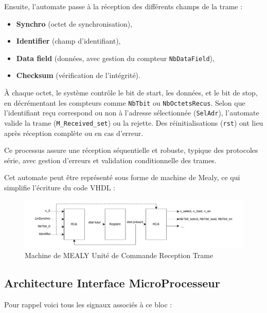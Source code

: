 Ensuite, l'automate passe à la réception des différents champs de la trame :
\begin{itemize}
    \item \textbf{Synchro} (octet de synchronisation),
    \item \textbf{Identifier} (champ d'identifiant),
    \item \textbf{Data field} (données, avec gestion du compteur \texttt{NbDataField}),
    \item \textbf{Checksum} (vérification de l'intégrité).
\end{itemize}

À chaque octet, le système contrôle le bit de start, les données, et le bit de stop, en décrémentant 
les compteurs comme \texttt{NbTbit} ou \texttt{NbOctetsRecus}. Selon que l'identifiant reçu 
correspond ou non à l'adresse sélectionnée (\texttt{SelAdr}), l'automate valide la trame 
(\texttt{M\_Received\_set}) ou la rejette. Des réinitialisations (\texttt{rst}) ont lieu après 
réception complète ou en cas d'erreur.

Ce processus assure une réception séquentielle et robuste, typique des protocoles série, avec gestion 
d'erreurs et validation conditionnelle des trames.

Cet automate peut être représenté sous forme de machine de Mealy, ce qui simplifie l'écriture du 
code VHDL : 

\begin{figure}[H]
    \centering
    \includegraphics[width=0.8\linewidth]{images/inter/MEALY_Reception_trame.pdf}
    \caption{Machine de MEALY Unité de Commande Reception Trame}
    \label{fig:placeholder}
\end{figure}

\subsection{Architecture Interface MicroProcesseur}

Pour rappel voici tous les signaux associés à ce bloc : 
\newline

